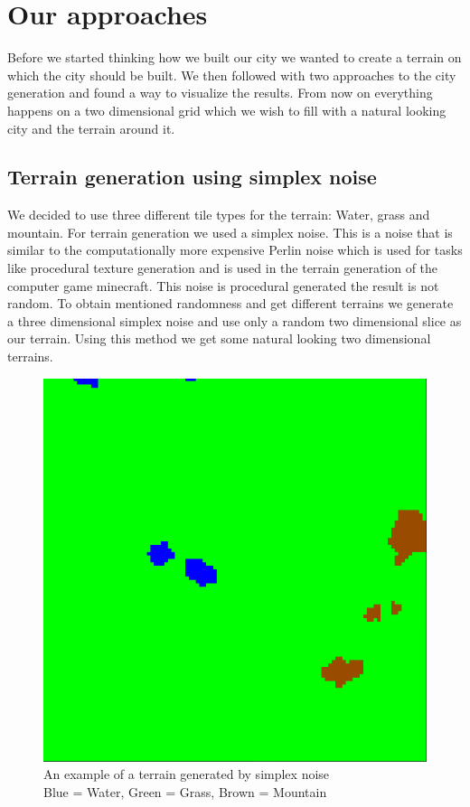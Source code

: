 \documentclass{scrartcl}
\begin{document}
\section{Our approaches}
Before we started thinking how we built our city we wanted to create a terrain
on which the city should be built. We then followed with two approaches to the
city generation and found a way to visualize the results.
From now on everything happens on a two dimensional grid which we wish to fill
with a natural looking city and the terrain around it.

\subsection{Terrain generation using simplex noise}
We decided to use three different tile types for the terrain: Water, grass and mountain.
For terrain generation we used a simplex noise. This is a noise that is similar
to the computationally more expensive Perlin noise which is used for tasks like
procedural texture generation and is used in the terrain generation of the computer
game minecraft. This noise is procedural generated the result is not random. To
obtain mentioned randomness and get different terrains we generate
a three dimensional simplex noise and use only a random two dimensional slice as our terrain.
Using this method we get some natural looking two dimensional terrains.
\begin{figure}
  \centering
  \includegraphics[scale = 0.2]{terrain_example}
  \caption{An example of a terrain generated by simplex noise \\Blue = Water, Green = Grass, Brown = Mountain}
\end{figure}
\end{document}
